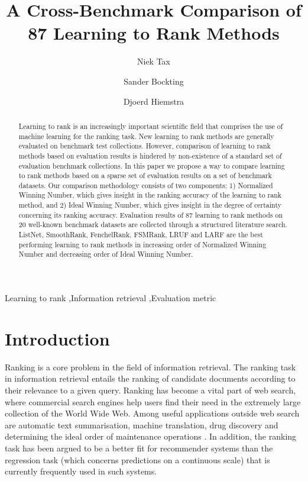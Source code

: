 \documentclass[english, authoryear, preprint]{elsarticle}
\begin{document}
\begin{frontmatter}
\title{A Cross-Benchmark Comparison of 87 Learning to Rank Methods}
\author[avanade,ut]{Niek Tax}
\author[avanade]{Sander Bockting}
\author[ut]{Djoerd Hiemstra}
\address[avanade]{Avanade Netherlands B.V., Versterkerstraat 6,
1322AP Almere, the Netherlands}
\address[ut]{University of Twente, P.O. Box 217, 7500AE Enschede,
the Netherlands}
\begin{abstract}
Learning to rank is an increasingly important scientific field that comprises the use of machine learning for the ranking task. New learning to rank methods are generally evaluated on benchmark test collections. However, comparison of learning to rank methods based on evaluation results is hindered by non-existence of a standard set of evaluation benchmark collections. In this paper we propose a way to compare learning to rank methods based on a sparse set of evaluation results on a set of benchmark datasets. Our comparison methodology consists of two components: 1) Normalized Winning Number, which gives insight in the ranking accuracy of the learning to rank method, and 2) Ideal Winning Number, which gives insight in the degree of certainty concerning its ranking accuracy. Evaluation results of 87 learning to rank methods on 20 well-known benchmark datasets are collected through a structured literature search. ListNet, SmoothRank, FenchelRank, FSMRank, LRUF and LARF are the best performing learning to rank methods in increasing order of Normalized Winning Number and decreasing order of Ideal Winning Number.
\end{abstract}
\begin{keyword}
Learning to rank \sep Information retrieval \sep Evaluation metric
\end{keyword}
\end{frontmatter}

\section{Introduction}
Ranking is a core problem in the field of information retrieval. The ranking task in information retrieval entails the ranking of candidate documents according to their relevance to a given query. Ranking has become a vital part of web search, where commercial search engines help users find their need in the extremely large collection of the World Wide Web. Among useful applications outside web search are automatic text summarisation, machine translation, drug discovery and determining the ideal order of maintenance operations \cite{Rudin2009}. In addition, the ranking task has been argued to be a better fit for recommender systems than the regression task \cite{McNee2006} (which concerns predictions on a continuous scale) that is currently frequently used in such systems.\\
\end{document}
